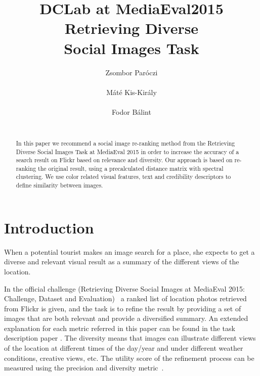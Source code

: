 \documentclass{sig-alternate}
\begin{document}

\title{DCLab at MediaEval2015 Retrieving Diverse \\ Social Images Task}


\author{
\alignauthor
Zsombor Par\'oczi\\
       \\
\alignauthor
M\'at\'e Kis-Kir\'aly \\
		\\
\alignauthor
Fodor B\'alint\\
		\\
}

\maketitle
\begin{abstract}
In this paper we recommend a social image re-ranking method from the Retrieving Diverse Social Images Task at MediaEval 2015 in order to increase the accuracy of a search result on Flickr based on relevance and diversity. Our approach is based on re-ranking the original result, using a precalculated distance matrix with spectral clustering. We use color related visual features, text and credibility descriptors to define similarity between images.
\end{abstract}

\section{Introduction}

When a potential tourist makes an image search for a place, she expects to get a diverse and relevant visual result as a summary of the different views of the location. 

In the official challenge (Retrieving Diverse Social Images at MediaEval 2015: Challenge, Dataset and Evaluation)~\cite{Task2015} a ranked list of location photos retrieved from Flickr is given, and the task is to refine the result by providing a set of images that are both relevant and provide a diversified summary. An extended explanation for each metric referred in this paper can be found in the task description paper \cite{Task2015}. The diversity means that images can illustrate different views of the location at different times of the day/year and under different weather conditions, creative views, etc. The utility score of the refinement process can be measured using the precision and diversity metric~\cite{Taneva2010}. 
\end{document}
